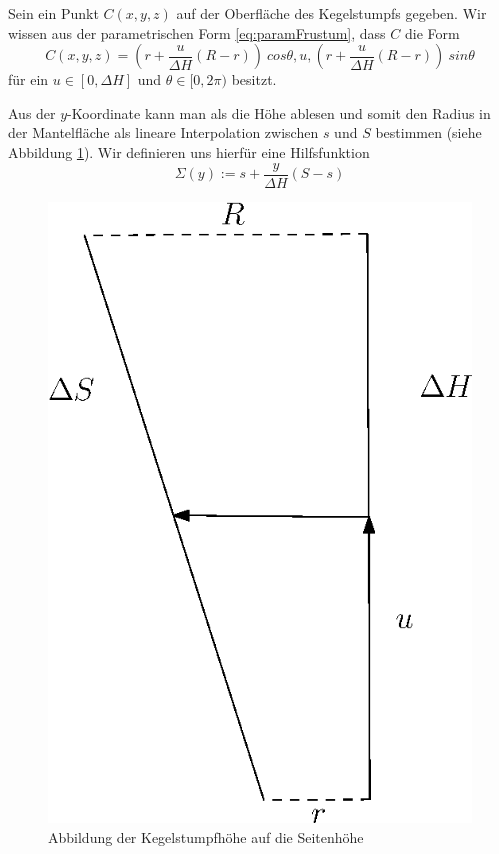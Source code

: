 Sein ein Punkt $C(x,y,z)$ auf der Oberfläche des Kegelstumpfs gegeben. Wir wissen aus der parametrischen Form \ref{eq:paramFrustum}, dass $C$ die Form
\[
C(x,y,z) = (r + \frac{u}{\Delta H} (R - r))~cos \theta, u, (r + \frac{u}{\Delta H} (R - r))~sin \theta
\]  für ein $u\in [0, \Delta H]$ und $\theta \in [0, 2\pi)$ besitzt. 

Aus der $y$-Koordinate kann man als die Höhe ablesen und somit den Radius in der Mantelfläche als lineare Interpolation zwischen $s$ und $S$ bestimmen (siehe Abbildung \ref{fig:mapToLateralS}). Wir definieren uns hierfür eine Hilfsfunktion 
\begin{equation} \label{eq:Sigma}
	\Sigma(y) := s + \frac{y}{\Delta H} (S-s)
\end{equation}


\begin{figure}[!htb]
	\centering
	\includegraphics[scale=.7]{images/mapToLateralS.eps}
	\caption{Abbildung der Kegelstumpfhöhe auf die Seitenhöhe}
	\label{fig:mapToLateralS}
\end{figure}

